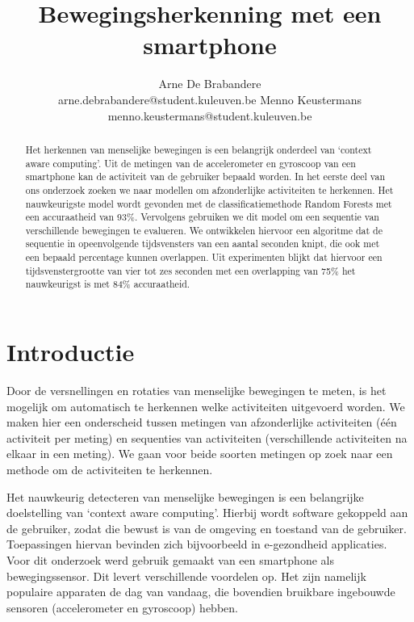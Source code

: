 \documentclass{article}
\title{Bewegingsherkenning met een smartphone}
\author{Arne De Brabandere\\
	arne.debrabandere@student.kuleuven.be
    \And
    Menno Keustermans\\
    menno.keustermans@student.kuleuven.be}
\begin{document}
\maketitle

\begin{abstract}

Het herkennen van menselijke bewegingen is een belangrijk onderdeel van `context aware computing'. Uit de metingen van de accelerometer en gyroscoop van een smartphone kan de activiteit van de gebruiker bepaald worden. In het eerste deel van ons onderzoek zoeken we naar modellen om afzonderlijke activiteiten te herkennen. Het nauwkeurigste model wordt gevonden met de classificatiemethode Random Forests met een accuraatheid van 93\%. Vervolgens gebruiken we dit model om een sequentie van verschillende bewegingen te evalueren. We ontwikkelen hiervoor een algoritme dat de sequentie in opeenvolgende tijdsvensters van een aantal seconden knipt, die ook met een bepaald percentage kunnen overlappen. Uit experimenten blijkt dat hiervoor een tijdsvenstergrootte van vier tot zes seconden met een overlapping van 75\% het nauwkeurigst is met 84\% accuraatheid.

\end{abstract}

\section{Introductie}

Door de versnellingen en rotaties van menselijke bewegingen te meten, is het mogelijk om automatisch te herkennen welke activiteiten uitgevoerd worden. We maken hier een onderscheid tussen metingen van afzonderlijke activiteiten (\'e\'en activiteit per meting) en sequenties van activiteiten (verschillende activiteiten na elkaar in een meting). We gaan voor beide soorten metingen op zoek naar een methode om de activiteiten te herkennen.

Het nauwkeurig detecteren van menselijke bewegingen is een belangrijke doelstelling van `context aware computing'. Hierbij wordt software gekoppeld aan de gebruiker, zodat die bewust is van de omgeving en toestand van de gebruiker. Toepassingen hiervan bevinden zich bijvoorbeeld in e-gezondheid applicaties. Voor dit onderzoek werd gebruik gemaakt van een smartphone als bewegingssensor. Dit levert verschillende voordelen op. Het zijn namelijk populaire apparaten de dag van vandaag, die bovendien bruikbare ingebouwde sensoren (accelerometer en gyroscoop) hebben.
\end{document}
